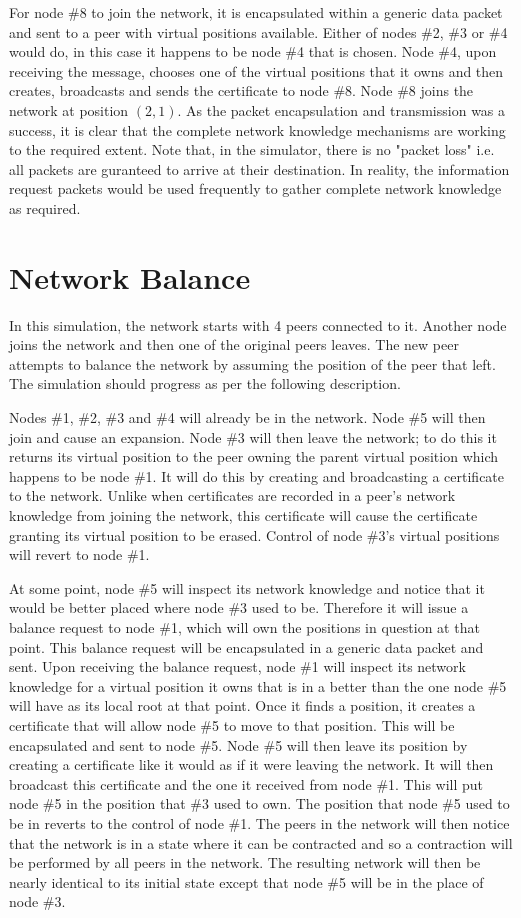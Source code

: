 \documentclass[ %
                    author={Luke Murray},
                supervisor={Dr. Simon Hollis},
                     title={Shadow Peer-to-Peer Networks},
                  subtitle={},
                    degree={MEng},
                      year={2013} ]{thesis}
\begin{document}
For node \#8 to join the network, it is encapsulated within a generic data packet and sent to a peer with virtual positions available. Either of nodes \#2, \#3 or \#4 would do, in this case it happens to be node \#4 that is chosen. Node \#4, upon receiving the message, chooses one of the virtual positions that it owns and then creates, broadcasts and sends the certificate to node \#8. Node \#8 joins the network at position $(2, 1)$. As the packet encapsulation and transmission was a success, it is clear that the complete network knowledge mechanisms are working to the required extent. Note that, in the simulator, there is no "packet loss" i.e. all packets are guranteed to arrive at their destination. In reality, the information request packets would be used frequently to gather complete network knowledge as required.

\section{Network Balance}

In this simulation, the network starts with 4 peers connected to it. Another node joins the network and then one of the original peers leaves. The new peer attempts to balance the network by assuming the position of the peer that left. The simulation should progress as per the following description.

Nodes \#1, \#2, \#3 and \#4 will already be in the network. Node \#5 will then join and cause an expansion. Node \#3 will then leave the network; to do this it returns its virtual position to the peer owning the parent virtual position which happens to be node \#1. It will do this by creating and broadcasting a certificate to the network. Unlike when certificates are recorded in a peer's network knowledge from joining the network, this certificate will cause the certificate granting its virtual position to be erased. Control of node \#3's virtual positions will revert to node \#1.

At some point, node \#5 will inspect its network knowledge and notice that it would be better placed where node \#3 used to be. Therefore it will issue a balance request to node \#1, which will own the positions in question at that point. This balance request will be encapsulated in a generic data packet and sent. Upon receiving the balance request, node \#1 will inspect its network knowledge for a virtual position it owns that is in a better than the one node \#5 will have as its local root at that point. Once it finds a position, it creates a certificate that will allow node \#5 to move to that position. This will be encapsulated and sent to node \#5. Node \#5 will then leave its position by creating a certificate like it would as if it were leaving the network. It will then broadcast this certificate and the one it received from node \#1. This will put node \#5 in the position that \#3 used to own. The position that node \#5 used to be in reverts to the control of node \#1. The peers in the network will then notice that the network is in a state where it can be contracted and so a contraction will be performed by all peers in the network. The resulting network will then be nearly identical to its initial state except that node \#5 will be in the place of node \#3.
\end{document}
